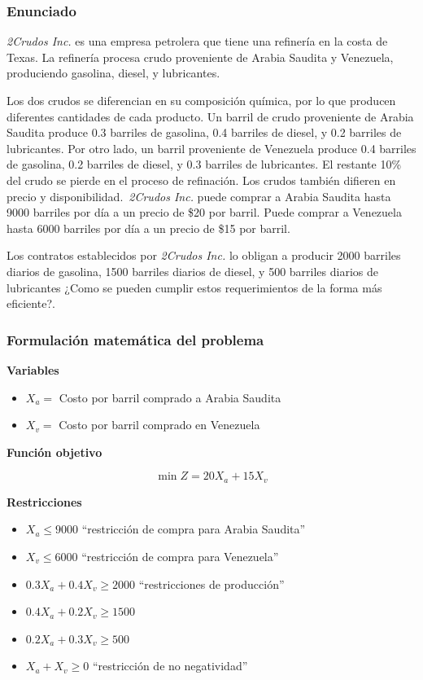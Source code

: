 \documentclass[conference]{IEEEtran}
\begin{document}
\subsubsection{Enunciado}

\textit{2Crudos Inc.} es una empresa petrolera que tiene una refinería en
la costa de Texas. La refinería procesa crudo proveniente de Arabia Saudita y
Venezuela, produciendo gasolina, diesel, y lubricantes.

Los dos crudos se diferencian en su composición química, por lo que
producen diferentes cantidades de cada producto. Un barril de crudo
proveniente de Arabia Saudita produce 0.3 barriles de gasolina, 0.4 barriles
de diesel, y 0.2 barriles de lubricantes. Por otro lado, un barril proveniente
de Venezuela produce 0.4 barriles de gasolina, 0.2 barriles de diesel, y
0.3 barriles de lubricantes. El restante 10\% del crudo se pierde en el
proceso de refinación. Los crudos también difieren en precio y
disponibilidad.~\textit{2Crudos Inc.} puede comprar a Arabia Saudita hasta 9000
barriles por día a un precio de \$20 por barril. Puede comprar a Venezuela
hasta 6000 barriles por día a un precio de \$15 por barril.

Los contratos establecidos por \textit{2Crudos Inc.} lo obligan a producir 2000
barriles diarios de gasolina, 1500 barriles diarios de diesel, y 500
barriles diarios de lubricantes ¿Como se pueden cumplir estos requerimientos
de la forma más eficiente?.

\subsubsection{Formulación matemática del problema}

\hfil{}

\textbf{Variables}

\begin{itemize}
    \item $X_{a} = $ Costo por barril comprado a Arabia Saudita
    \item $X_{v} = $ Costo por barril comprado en Venezuela
\end{itemize}

\textbf{Función objetivo}

\begin{equation*}
    \min Z = 20X_{a} + 15X_{v}
\end{equation*}

\textbf{Restricciones}

\begin{itemize}
    \item $X_{a} \leq 9000$ ``restricción de compra para Arabia Saudita''
    \item $X_{v} \leq 6000$ ``restricción de compra para Venezuela''
    \item $0.3X_{a} + 0.4X_{v} \geq 2000$ ``restricciones de producción''
    \item $0.4X_{a} + 0.2X_{v} \geq 1500$
    \item $0.2X_{a} + 0.3X_{v} \geq 500$
    \item $X_{a} + X_{v} \geq 0$ ``restricción de no negatividad''
\end{itemize}
\end{document}
